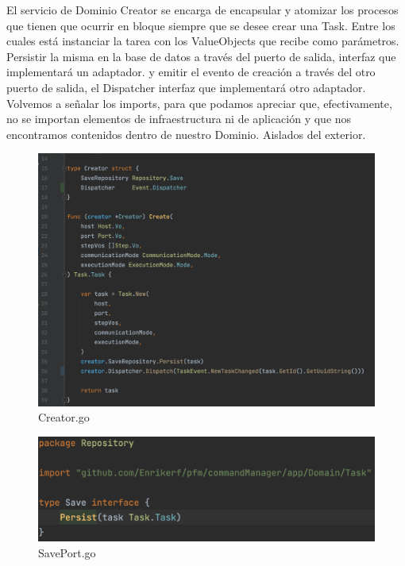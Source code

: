 El servicio de Dominio Creator se encarga de encapsular y atomizar los procesos que tienen que ocurrir en bloque siempre que se desee crear una Task. Entre los cuales está instanciar la tarea con los ValueObjects que recibe como parámetros. Persistir la misma en la base de datos a través del puerto de salida, interfaz que implementará un adaptador. y emitir el evento de creación a través del otro puerto de salida, el Dispatcher interfaz que implementará otro adaptador. Volvemos a señalar los imports, para que podamos apreciar que, efectivamente, no se importan elementos de infraestructura ni de aplicación y que nos encontramos contenidos dentro de nuestro Dominio. Aislados del exterior.

\begin{figure}[H]
    \centering
    \includegraphics[height=0.4\textheight]{./part/Ejecucion/Seguimiento/CreateTaskUseCase/img/PFM - creator}
    \caption{Creator.go}\label{fig:Creator}
\end{figure}

\begin{figure}[H]
    \centering
    \includegraphics[height=0.1\textheight]{./part/Ejecucion/Seguimiento/CreateTaskUseCase/img/PFM - SavePort}
    \caption{SavePort.go}\label{fig:SavePort}
\end{figure}

